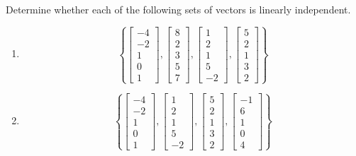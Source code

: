 \documentclass{ximera}
\begin{document}
\begin{problem}\label{prob_oct_ideas_2}
    Determine whether each of the following sets of vectors is linearly independent.  
    \begin{enumerate}
        \item $$\left\{\begin{bmatrix}-4\\-2\\1\\0\\1\end{bmatrix},\begin{bmatrix}8\\2\\3\\5\\7\end{bmatrix},\begin{bmatrix}1\\2\\1\\5\\-2\end{bmatrix}, \begin{bmatrix}5\\2\\1\\3\\2\end{bmatrix}\right\}$$

        \item $$\left\{\begin{bmatrix}-4\\-2\\1\\0\\1\end{bmatrix},\begin{bmatrix}1\\2\\1\\5\\-2\end{bmatrix}, \begin{bmatrix}5\\2\\1\\3\\2\end{bmatrix},\begin{bmatrix}-1\\6\\1\\0\\4\end{bmatrix}\right\}$$
    \end{enumerate}
    
\end{problem}
\end{document}
